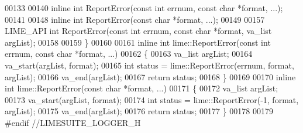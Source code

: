 \begin{DoxyCode}
00133 
00140 \textcolor{keyword}{inline} \textcolor{keywordtype}{int} ReportError(\textcolor{keyword}{const} \textcolor{keywordtype}{int} errnum, \textcolor{keyword}{const} \textcolor{keywordtype}{char} *format, ...);
00141 
00148 \textcolor{keyword}{inline} \textcolor{keywordtype}{int} ReportError(\textcolor{keyword}{const} \textcolor{keywordtype}{char} *format, ...);
00149 
00157 LIME_API \textcolor{keywordtype}{int} ReportError(\textcolor{keyword}{const} \textcolor{keywordtype}{int} errnum, \textcolor{keyword}{const} \textcolor{keywordtype}{char} *format, va\_list argList);
00158 
00159 \}
00160 
00161 \textcolor{keyword}{inline} \textcolor{keywordtype}{int} lime::ReportError(\textcolor{keyword}{const} \textcolor{keywordtype}{int} errnum, \textcolor{keyword}{const} \textcolor{keywordtype}{char} *format, ...)
00162 \{
00163     va\_list argList;
00164     va\_start(argList, format);
00165     \textcolor{keywordtype}{int} status = lime::ReportError(errnum, format, argList);
00166     va\_end(argList);
00167     \textcolor{keywordflow}{return} status;
00168 \}
00169 
00170 \textcolor{keyword}{inline} \textcolor{keywordtype}{int} lime::ReportError(\textcolor{keyword}{const} \textcolor{keywordtype}{char} *format, ...)
00171 \{
00172     va\_list argList;
00173     va\_start(argList, format);
00174     \textcolor{keywordtype}{int} status = lime::ReportError(-1, format, argList);
00175     va\_end(argList);
00176     \textcolor{keywordflow}{return} status;
00177 \}
00178 
00179 \textcolor{preprocessor}{#endif //LIMESUITE\_LOGGER\_H}
\end{DoxyCode}
